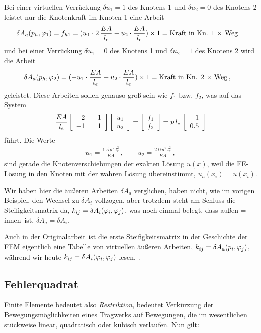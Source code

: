 Bei einer virtuellen Verr\"{u}ckung $\delta u_1 = 1$ des Knotens 1 und $\delta u_2 = 0$ des Knotens 2 leistet nur die Knotenkraft im Knoten 1 eine Arbeit
\begin{align}
\delta A_a(p_{h} ,\Np_1) &= f_{h1} = (u_1 \cdot 2\,\frac{EA}{l_e} - u_2 \cdot \frac{EA}{l_e}) \times 1 = \text{Kraft in Kn. 1 $\times$ Weg}
\end{align}
und bei einer Verr\"{u}ckung $\delta u_1 = 0$ des Knotens 1 und $\delta u_2 = 1$ des Knotens 2 wird die Arbeit
\begin{align}
\delta A_a(p_{h} ,\Np_2) &= (- u_1 \cdot \frac{EA}{l_e} + u_2\cdot \frac{EA}{l_e}) \times 1  = \text{Kraft in Kn. 2 $\times$ Weg}
\,,
\end{align}
geleistet. Diese Arbeiten sollen genauso gro{\ss} sein wie $f_1$ bzw. $f_2$, was auf das System
\begin{align}
\frac{EA}{l_e} \left[\barr{r r} 2 & -1 \\ -1 & 1 \earr \right]
\left[\barr{r} u_1 \\ u_2 \earr \right] = \left[\barr{r } f_1 \\
f_2 \earr \right] = p\,l_e\,\left[\barr{r } 1 \\
0.5 \earr \right]
\end{align}
f\"{u}hrt. Die Werte
\begin{align}
u_1 = \frac{1.5\,p^{\,2}\,l_e^2}{EA}\,, \qquad u_2 = \frac{2.0\,p^{\,2}\,l_e^2}{EA}\,,
\end{align}
sind gerade die Knotenverschiebungen der exakten L\"{o}sung $u(x)$, weil die FE-L\"{o}sung in den Knoten mit der wahren L\"{o}sung \"{u}bereinstimmt, $u_h(x_i) = u(x_i)$.

Wir haben hier die \"{a}u{\ss}eren Arbeiten $\delta A_a$ verglichen, haben nicht, wie im vorigen Beispiel, den Wechsel zu $\delta A_i$ vollzogen,  aber trotzdem steht am Schluss die Steifigkeitsmatrix da, $k_{ij} = \delta A_i(\Np_i,\Np_j)$, was noch einmal belegt, dass \glq au{\ss}en = innen\grq\ ist, $\delta A_a = \delta A_i$.

Auch in der Originalarbeit \cite{Turner} ist die \glq erste\grq{} Steifigkeitsmatrix in der Geschichte der FEM eigentlich eine Tabelle von virtuellen \"{a}u{\ss}eren Arbeiten, $k_{ij} = \delta A_a(p_i,\Np_j)$, w\"{a}hrend wir heute $k_{ij} = \delta A_i(\Np_i,\Np_j)$ lesen, \cite{HaJa2}.

{\textcolor{sectionTitleBlue}{\section{Fehlerquadrat}}}\label{Fehlerquadrat}
Finite Elemente bedeutet also {\em Restriktion\/}, bedeutet Verk\"{u}rzung der
Bewegungs\-m\"{o}g\-lich\-keiten eines Tragwerks auf Bewegungen, die im wesentlichen
st\"{u}ckweise linear, quadratisch oder kubisch verlaufen. Nun gilt:\\

